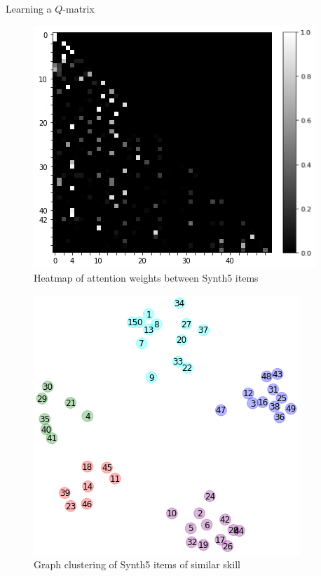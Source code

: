 \documentclass{beamer}
\theoremstyle{definition}
\let\oldfootnotesize\footnotesize
\renewcommand*{\footnotesize}{\oldfootnotesize\tiny}
\begin{document}
\begin{frame}{Learning a $Q$-matrix}
  \begin{figure}
  \includegraphics[width=.95\textwidth]{../img/kt_irt/synth5_attn_weights_no_ffn_axis2.png}
  \caption*{\centering \footnotesize Heatmap of attention weights between Synth5 items}
  \end{figure}
  \endminipage
  \centering
  \begin{figure}
  \includegraphics[width=.95\textwidth]{../img/kt_irt/synth5_clusters_no_ffn.png}
  \caption*{\footnotesize Graph clustering of Synth5 items of similar skill}
  \end{figure}
  \endminipage
\end{frame}
\end{document}
